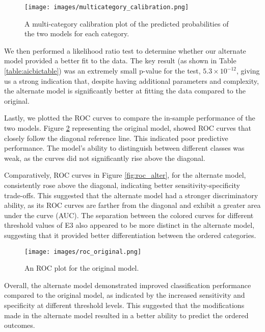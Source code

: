 \documentclass[titlepage]{article}
\begin{document}
\begin{figure}[H]
    \centering
    \texttt{[image: images/multicategory\_calibration.png]}
    \caption{A multi-category calibration plot of the predicted probabilities of the two models for each category.}
    \label{fig:calib_plot}
\end{figure}

\justify
We then performed a likelihood ratio test to determine whether our alternate model provided a better fit to the data. The key result (as shown in Table \ref{table:aicbictable}) was an extremely small p-value for the test, $5.3 \times 10^{-12}$, giving us a strong indication that, despite having additional parameters and complexity, the alternate model is significantly better at fitting the data compared to the original.

\justify
Lastly, we plotted the ROC curves to compare the in-sample performance of the two models. Figure \ref{fig:roc_orig} representing the original model, showed ROC curves that closely follow the diagonal reference line. This indicated poor predictive performance. The model’s ability to distinguish between different classes was weak, as the curves did not significantly rise above the diagonal.

\justify
Comparatively, ROC curves in Figure \ref{fig:roc_alter}, for the alternate model, consistently rose above the diagonal, indicating better sensitivity-specificity trade-offs. This suggested that the alternate model had a stronger discriminatory ability, as its ROC curves are farther from the diagonal and exhibit a greater area under the curve (AUC). The separation between the colored curves for different threshold values of E3 also appeared to be more distinct in the alternate model, suggesting that it provided better differentiation between the ordered categories.


\begin{figure}[H]
    \centering
    \texttt{[image: images/roc\_original.png]}
    \caption{An ROC plot for the original model.}
    \label{fig:roc_orig}
\end{figure}

\justify
Overall, the alternate model demonstrated improved classification performance compared to the original model, as indicated by the increased sensitivity and specificity at different threshold levels. This suggested that the modifications made in the alternate model resulted in a better ability to predict the ordered outcomes.
\end{document}
